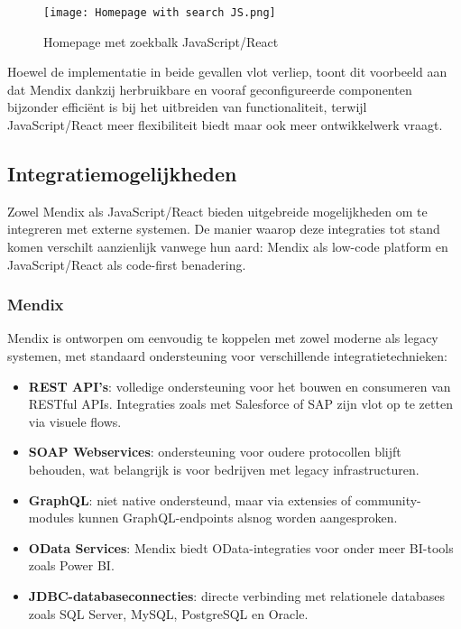 \begin{figure}[H]
    \centering
    \captionsetup{justification=centering}
    \texttt{[image: Homepage with search JS.png]}
    \caption[\centering Homepage with search bar JavaScript/React]{\label{fig:homepage-with-search-JS} Homepage met zoekbalk JavaScript/React}
\end{figure}


 Hoewel de implementatie in beide gevallen vlot verliep, toont dit voorbeeld aan dat Mendix dankzij herbruikbare en vooraf geconfigureerde componenten bijzonder efficiënt is bij het uitbreiden van functionaliteit, terwijl JavaScript/React meer flexibiliteit biedt maar ook meer ontwikkelwerk vraagt.


\subsection{Integratiemogelijkheden}

Zowel Mendix als JavaScript/React bieden uitgebreide mogelijkheden om te integreren met externe systemen. De manier waarop deze integraties tot stand komen verschilt aanzienlijk vanwege hun aard: Mendix als low-code platform en JavaScript/React als code-first benadering.

\subsubsection{Mendix}

Mendix is ontworpen om eenvoudig te koppelen met zowel moderne als legacy systemen, met standaard ondersteuning voor verschillende integratietechnieken:
\begin{itemize}
    \item \textbf{REST \gls{API}'s}: volledige ondersteuning voor het bouwen en consumeren van RESTful APIs. Integraties zoals met Salesforce of SAP zijn vlot op te zetten via visuele flows.
    \item \textbf{SOAP Webservices}: ondersteuning voor oudere protocollen blijft behouden, wat belangrijk is voor bedrijven met legacy infrastructuren.
    \item \textbf{GraphQL}: niet native ondersteund, maar via extensies of community-modules kunnen GraphQL-endpoints alsnog worden aangesproken.
    \item \textbf{OData Services}: Mendix biedt OData-integraties voor onder meer BI-tools zoals Power BI.
    \item \textbf{JDBC-databaseconnecties}: directe verbinding met relationele databases zoals SQL Server, MySQL, PostgreSQL en Oracle.
\end{itemize}

